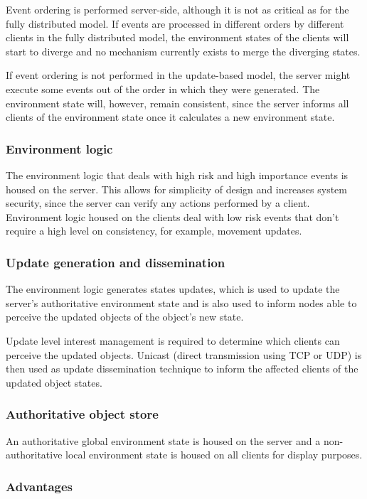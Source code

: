 Event ordering is performed server-side, although it is not as critical as for the fully distributed model. If events are processed in different orders by different clients in the fully distributed model, the environment states of the clients will start to diverge and no mechanism currently exists to merge the diverging states.

If event ordering is not performed in the update-based model, the server might execute some events out of the order in which they were generated. The environment state will, however, remain consistent, since the server informs all clients of the environment state once it calculates a new environment state.

\subsubsection{Environment logic}
The environment logic that deals with high risk and high importance events is housed on the server. This allows for simplicity of design and increases system security, since the server can verify any actions performed by a client. Environment logic housed on the clients deal with low risk events that don't require a high level on consistency, for example, movement updates.

\subsubsection{Update generation and dissemination}

The environment logic generates states updates, which is used to update the server's authoritative environment state and is also used to inform nodes able to perceive the updated objects of the object's new state.

Update level interest management is required to determine which clients can perceive the updated objects. Unicast (direct transmission using TCP or UDP) is then used as update dissemination technique to inform the affected clients of the updated object states.

\subsubsection{Authoritative object store}
An authoritative global environment state is housed on the server and a  non-authoritative local environment state is housed on all clients for display purposes.

\subsubsection{Advantages}

